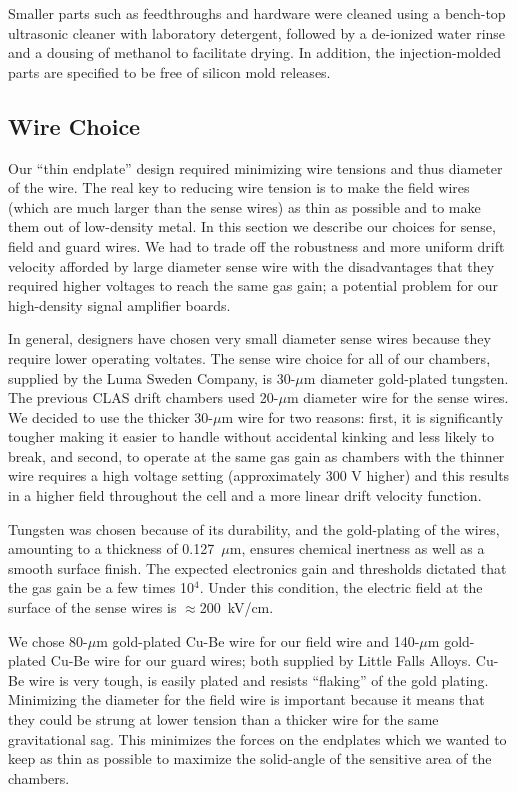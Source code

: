 Smaller parts such as feedthroughs and hardware were cleaned using a 
bench-top ultrasonic cleaner with laboratory detergent, followed by a 
de-ionized water rinse and a dousing of methanol to facilitate drying.  
In addition, the injection-molded parts are specified to be free of silicon 
mold releases.



\subsection{Wire Choice}
\hskip 0.15in
Our ``thin endplate'' design required minimizing wire tensions and
thus diameter of the wire.  The real key to reducing wire tension is to
make the field wires (which are much larger than the sense wires) as 
thin as possible and to make them out of low-density metal.  In this 
section we describe our choices for sense, field and guard wires.
We had to trade off the robustness and more uniform drift velocity
afforded by large diameter sense wire with the disadvantages that they
required higher voltages to reach the same gas gain; 
a potential problem for our high-density signal amplifier boards.

In general, designers have chosen very small diameter sense wires because they
require lower operating voltates.
The sense wire choice for all of our chambers, supplied by the Luma
Sweden Company, is 30-$\mu$m diameter gold-plated tungsten.  
The previous CLAS drift chambers used 20-$\mu$m diameter wire for the
sense wires.  We decided to use the thicker 30-$\mu$m wire for two 
reasons: first, it is significantly tougher making it easier to handle without
accidental kinking and less likely to break, and second, to operate at the same 
gas gain as chambers with the thinner wire requires a high voltage setting 
(approximately 300 V higher) and this results in a higher field throughout the cell
and a more linear drift velocity function.  

Tungsten was chosen because of its durability, 
and the gold-plating of the wires, amounting to a thickness of 0.127~$\mu$m, 
ensures chemical inertness as well as a smooth surface finish.  The expected 
electronics gain and thresholds dictated that the gas gain be a few times 
10$^4$.  Under this condition, the electric field at the surface of the sense 
wires is $\approx$200~kV/cm.  

We chose 80-$\mu$m gold-plated Cu-Be wire for our field wire and
140-$\mu$m gold-plated Cu-Be wire for our guard wires; both supplied
by Little Falls Alloys.
Cu-Be wire is very tough, is easily plated and resists ``flaking'' of the gold
plating. 
Minimizing the diameter for the field wire is important because it means that they 
could be strung at lower tension than a thicker wire for the same gravitational sag.  
This minimizes the forces on the endplates which we wanted to keep as 
thin as possible to maximize the solid-angle of the sensitive area of
the chambers.

